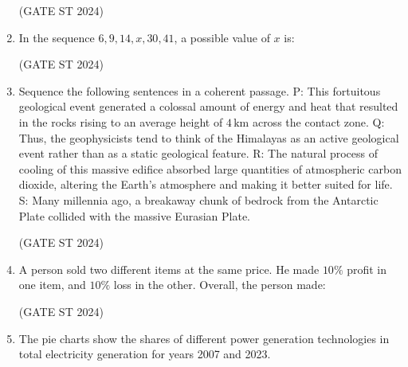 \documentclass[journal,12pt,onecolumn]{IEEEtran}
\theoremstyle{remark}
\begin{document}
\begin{enumerate}
\begin{enumerate}
\end{enumerate}
\hfill (GATE ST 2024)
\item 
In the sequence $6, 9, 14, x, 30, 41$, a possible value of $x$ is:

\begin{enumerate}
\end{enumerate}
\hfill (GATE ST 2024)
\item 
Sequence the following sentences in a coherent passage.  
P: This fortuitous geological event generated a colossal amount of energy and heat that resulted in the rocks rising to an average height of $4\,\mathrm{km}$ across the contact zone.  
Q: Thus, the geophysicists tend to think of the Himalayas as an active geological event rather than as a static geological feature.  
R: The natural process of cooling of this massive edifice absorbed large quantities of atmospheric carbon dioxide, altering the Earth's atmosphere and making it better suited for life.  
S: Many millennia ago, a breakaway chunk of bedrock from the Antarctic Plate collided with the massive Eurasian Plate.

\begin{enumerate}
\end{enumerate}
\hfill (GATE ST 2024)
\item 
A person sold two different items at the same price.  
He made $10\%$ profit in one item, and $10\%$ loss in the other.  
Overall, the person made:

\begin{enumerate}
\end{enumerate}
\hfill (GATE ST 2024)
\item 
The pie charts show the shares of different power generation technologies in total electricity generation for years 2007 and 2023.


\end{enumerate}
\end{document}
